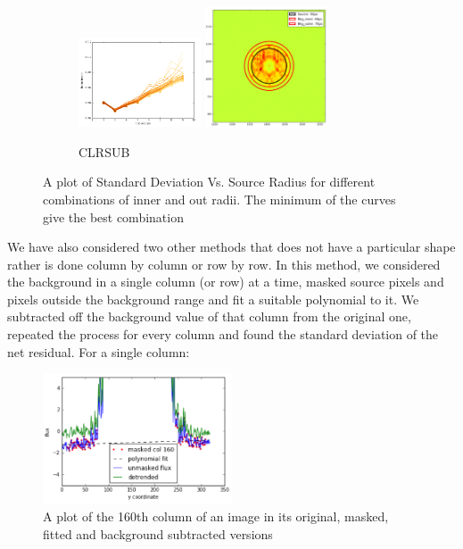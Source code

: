 \documentclass{aastex6}
\begin{document}
\begin{figure}[H]
            \begin{subfigure}{3}
                \includegraphics[width = 0.4\textwidth]{Radius_CLR}
                \includegraphics[width = 0.4\textwidth]{full1_rings}
                \caption{CLRSUB}
            \end{subfigure}
            \caption{A plot of Standard Deviation Vs. Source Radius for different combinations of inner and out radii. The minimum of the curves give the best combination}
        \end{figure}
        
        We have also considered two other methods that does not have a particular shape rather is done column by column or row by row. In this method, we considered the background in a single column (or row) at a time, masked source pixels and pixels outside the background range and fit a suitable polynomial to it. We subtracted off the background value of that column from the original one, repeated the process for every column and found the standard deviation of the net residual. For a single column:\\
        
        \begin{figure}[H]
            \centering
            \includegraphics[width = 0.5\textwidth]{col_plot}
            \caption{A plot of the 160th column of an image in its original, masked, fitted and background subtracted versions}
            \end{figure}
            
\end{document}
